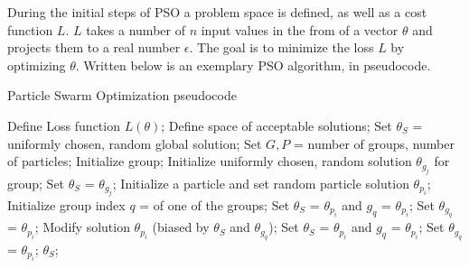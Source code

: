 During the initial steps of PSO a problem space is defined, as well as a cost function $L$. $L$ takes a number of $n$ input values in the from of a
vector $\theta$ and projects them to a real number $\epsilon$. The goal is to minimize the loss $L$ by optimizing $\theta$.
Written below is an exemplary PSO algorithm, in  pseudocode.

\begin{algorithm}
	\caption{Particle Swarm Optimization pseudocode}
	\begin{algorithmic}
		\State Define Loss function $L(\theta)$;
		\State Define space of acceptable solutions;
		\State Set $\theta_S$ = uniformly chosen, random global solution;
		\State Set $G, P$ = number of groups, number of particles;
			\State Initialize group;
			\State Initialize uniformly chosen, random solution $\theta_{g_j}$ for group;
				\State Set $\theta_S$ = $\theta_{g_j}$;
			\EndIf
		\EndFor
			\State Initialize a particle and set random particle solution $\theta_{p_i}$;
			\State Initialize group index $q$ = of one of the groups;
				\State Set $\theta_S$ = $\theta_{p_i}$ and $g_q$ = $\theta_{p_i}$;
				\State Set $\theta_{g_q}$ = $\theta_{p_i}$;
			\EndIf
		\EndFor
				\State Modify solution $\theta_{p_i}$ (biased by $\theta_S$ and $\theta_{g_q}$);
					\State Set $\theta_S$ = $\theta_{p_i}$ and $g_q$ = $\theta_{p_i}$;
					\State Set $\theta_{g_q}$ = $\theta_{p_i}$;
				\EndIf
			\EndFor
		\EndWhile
		\State {} $\theta_S$;
	\end{algorithmic}
\end{algorithm}

